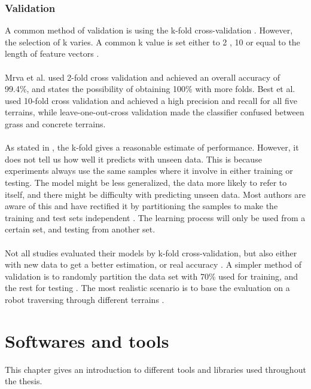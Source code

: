 \documentclass[USenglish]{ifimaster}  %
\begin{document}
\subsection{Validation}\label{subseq:validation}
A common method of validation is using the k-fold cross-validation  \cite{DBLP:conf/itat/MrvaF15,6784609,6386243,Hoffmann20141790,6849778,7387710}. However, the selection of k varies. A common k value is set either to 2  \cite{DBLP:conf/itat/MrvaF15,6784609}, 10 \cite{26b23e912c654fe4b7478fd910130195,6386243,Hoffmann20141790,6849778,7387710} or equal to the length of feature vectors \cite{26b23e912c654fe4b7478fd910130195}.
\\
\\
Mrva et al. \cite{DBLP:conf/itat/MrvaF15} used 2-fold cross validation and achieved an overall accuracy of 99.4\%, and states the possibility of obtaining 100\% with more folds. Best et al. \cite{26b23e912c654fe4b7478fd910130195} used 10-fold cross validation and achieved a high precision and recall for all five terrains, while leave-one-out-cross validation made the classifier confused between grass and concrete terrains. 
\\
\\
As stated in \cite{7387710}, the k-fold gives a reasonable estimate of performance. However, it does not tell us how well it predicts with unseen data. This is because experiments always use the same samples where it involve in either training or testing. The model might be less generalized, the data  more likely to refer to itself, and there might be difficulty with predicting unseen data. Most authors are aware of this and have rectified it by partitioning the samples to make the training and test sets independent \cite{26b23e912c654fe4b7478fd910130195}. The learning process will only be used from a certain set, and testing from another set.
\\
\\
Not all studies evaluated their models by k-fold cross-validation, but also either with new data to get a better estimation, or real accuracy \cite{5509309,Walas2015,5752869}. A simpler method of validation is to randomly partition the data set with 70\% used for training, and the rest for testing \cite{5752869}. The most realistic scenario is to base the evaluation on a robot traversing through different terrains \cite{DBLP:conf/itat/MrvaF15}.

\chapter{Softwares and tools} \label{chap:software}
This chapter gives an introduction to different tools and libraries used throughout the thesis.
\end{document}
